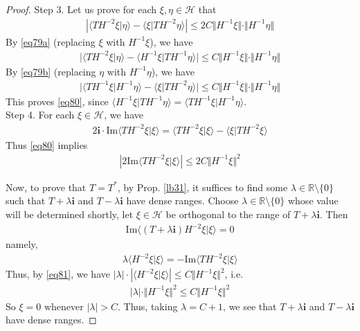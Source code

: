 \documentclass[12pt,b5paper,notitlepage]{article}
\theoremstyle{definition}
\theoremstyle{plain}
\newcommand{\mc}{\mathcal}
\newcommand{\bk}[1]{\langle {#1}\rangle}
\newcommand{\im}{\mathbf{i}}
\newcommand{\Rbb}{\mathbb R}
\newcommand{\Imag}{\mathrm{Im}}
\numberwithin{equation}{section}
\begin{document}
\begin{proof}
Step 3. Let us prove for each $\xi,\eta\in\mc H$ that
\begin{align}\label{eq80}
|\bk{TH^{-2}\xi|\eta}-\bk{\xi|TH^{-2}\eta}|\leq 2C\Vert H^{-1}\xi\Vert\cdot\Vert H^{-1}\eta\Vert
\end{align}
By \eqref{eq79a} (replacing $\xi$ with $H^{-1}\xi$), we have
\begin{gather*}
\big|\bk{TH^{-2}\xi|\eta}-\bk{H^{-1}\xi|TH^{-1}\eta} \big|\leq C\Vert H^{-1}\xi\Vert\cdot\Vert H^{-1}\eta\Vert
\end{gather*}
By \eqref{eq79b} (replacing $\eta$ with $H^{-1}\eta$), we have
\begin{align*}
\big|\bk{TH^{-1}\xi|H^{-1}\eta}-\bk{\xi|TH^{-2}\eta} \big|\leq C\Vert H^{-1}\xi\Vert\cdot \Vert H^{-1}\eta\Vert
\end{align*}
This proves \eqref{eq80}, since $\bk{H^{-1}\xi|TH^{-1}\eta}=\bk{TH^{-1}\xi|H^{-1}\eta}$.\\[-1ex]








Step 4. For each $\xi\in\mc H$, we have
\begin{align*}
2\im\cdot\Imag\bk{TH^{-2}\xi|\xi}=\bk{TH^{-2}\xi|\xi}-\bk{\xi|TH^{-2}\xi}
\end{align*}
Thus \eqref{eq80} implies
\begin{align}\label{eq81}
|2\Imag\bk{TH^{-2}\xi|\xi}|\leq 2C\Vert H^{-1}\xi\Vert^2
\end{align}

Now, to prove that $T=T^*$, by Prop. \ref{lb31}, it suffices to find some $\lambda\in\Rbb\setminus\{0\}$ such that $T+\lambda\im$ and $T-\lambda\im$ have dense ranges. Choose $\lambda\in\Rbb\setminus\{0\}$ whose value will be determined shortly, let $\xi\in\mc H$ be orthogonal to the range of $T+\lambda\im$. Then
\begin{align*}
\Imag\bk{(T+\lambda\im)H^{-2}\xi|\xi}=0
\end{align*}
namely,
\begin{align*}
\lambda \bk{H^{-2}\xi|\xi}=-\Imag\bk{TH^{-2}\xi|\xi}
\end{align*}
Thus, by \eqref{eq81}, we have $|\lambda|\cdot |\bk{H^{-2}\xi|\xi}|\leq C\Vert H^{-1}\xi\Vert^2$, i.e.
\begin{align*}
|\lambda|\cdot \Vert H^{-1}\xi\Vert^2\leq C\Vert H^{-1}\xi\Vert^2
\end{align*}
So $\xi=0$ whenever $|\lambda|>C$. Thus, taking $\lambda=C+1$, we see that $T+\lambda\im$ and $T-\lambda\im$ have dense ranges.
\end{proof}
\end{document}
